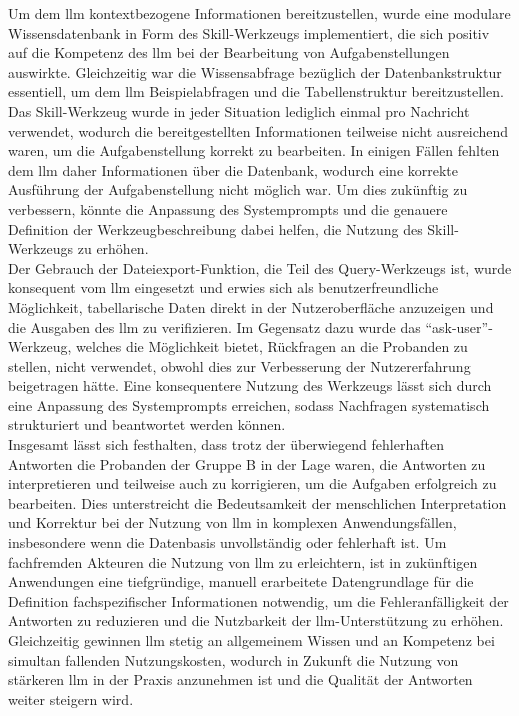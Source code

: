 Um dem \gls{llm} kontextbezogene Informationen bereitzustellen, wurde eine modulare Wissensdatenbank in Form des Skill-Werkzeugs implementiert,
die sich positiv auf die Kompetenz des \gls{llm} bei der Bearbeitung von Aufgabenstellungen auswirkte.
Gleichzeitig war die Wissensabfrage bezüglich der Datenbankstruktur essentiell, um dem \gls{llm} Beispielabfragen und die Tabellenstruktur bereitzustellen.
Das Skill-Werkzeug wurde in jeder Situation lediglich einmal pro Nachricht verwendet, wodurch die bereitgestellten Informationen teilweise nicht ausreichend waren, um die Aufgabenstellung korrekt zu bearbeiten.
In einigen Fällen fehlten dem \gls{llm} daher Informationen über die Datenbank, wodurch eine korrekte Ausführung der Aufgabenstellung nicht möglich war.
Um dies zukünftig zu verbessern, könnte die Anpassung des Systemprompts und die genauere Definition der Werkzeugbeschreibung dabei helfen, die Nutzung des Skill-Werkzeugs zu erhöhen. \\

Der Gebrauch der Dateiexport-Funktion, die Teil des Query-Werkzeugs ist, wurde konsequent vom \gls{llm} eingesetzt und erwies sich als benutzerfreundliche Möglichkeit,
tabellarische Daten direkt in der Nutzeroberfläche anzuzeigen und die Ausgaben des \gls{llm} zu verifizieren. 
Im Gegensatz dazu wurde das \enquote{ask-user}-Werkzeug, welches die Möglichkeit bietet, Rückfragen an die Probanden zu stellen, nicht verwendet, obwohl dies zur Verbesserung der Nutzererfahrung beigetragen hätte.
Eine konsequentere Nutzung des Werkzeugs lässt sich durch eine Anpassung des Systemprompts erreichen, sodass Nachfragen systematisch strukturiert und beantwortet werden können. \\

Insgesamt lässt sich festhalten, dass trotz der überwiegend fehlerhaften Antworten die Probanden der Gruppe B in der Lage waren, die Antworten zu interpretieren und teilweise auch zu korrigieren, um die Aufgaben erfolgreich zu bearbeiten.
Dies unterstreicht die Bedeutsamkeit der menschlichen Interpretation und Korrektur bei der Nutzung von \gls{llm} in komplexen Anwendungsfällen, insbesondere wenn die Datenbasis unvollständig oder fehlerhaft ist.
Um fachfremden Akteuren die Nutzung von \gls{llm} zu erleichtern, ist in zukünftigen Anwendungen eine tiefgründige, manuell erarbeitete Datengrundlage für die Definition fachspezifischer Informationen notwendig,
um die Fehleranfälligkeit der Antworten zu reduzieren und die Nutzbarkeit der \gls{llm}-Unterstützung zu erhöhen.
Gleichzeitig gewinnen \gls{llm} stetig an allgemeinem Wissen und an Kompetenz bei simultan fallenden Nutzungskosten, 
wodurch in Zukunft die Nutzung von stärkeren \gls{llm} in der Praxis anzunehmen ist und die Qualität der Antworten weiter steigern wird. \\

